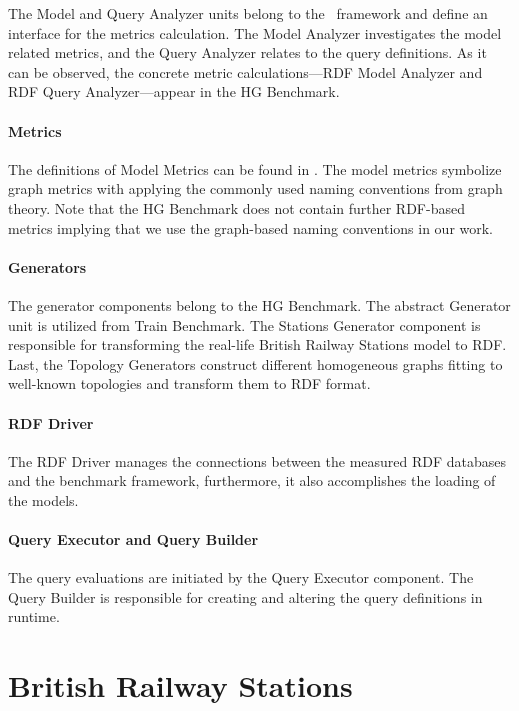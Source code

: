 The \textsf{Model} and \textsf{Query Analyzer} units belong to the \framework~framework and define an interface for the metrics calculation. The \textsf{Model Analyzer} investigates the model related metrics, and the \textsf{Query Analyzer} relates to the query definitions. As it can be observed, the concrete metric calculations---\textsf{RDF Model Analyzer} and \textsf{RDF Query Analyzer}---appear in the HG Benchmark.

\paragraph{Metrics}

The definitions of \textsf{Model Metrics} can be found in \framework. The model metrics symbolize graph metrics with applying the commonly used naming conventions from graph theory. Note that the HG Benchmark does not contain further RDF-based metrics implying that we use the graph-based naming conventions in our work.

\paragraph{Generators}

The generator components belong to the HG Benchmark. The abstract \textsf{Generator} unit is utilized from Train Benchmark. The \textsf{Stations Generator} component is responsible for transforming the real-life British Railway Stations model to RDF. Last, the \textsf{Topology Generators} construct different homogeneous graphs fitting to well-known topologies and transform them to RDF format.

\paragraph{RDF Driver}
The \textsf{RDF Driver} manages the connections between the measured RDF databases and the benchmark framework, furthermore, it also accomplishes the loading of the models. 

\paragraph{Query Executor and Query Builder}

The query evaluations are initiated by the \textsf{Query Executor} component. The \textsf{Query Builder} is responsible for creating and altering the query definitions in runtime.

\section{British Railway Stations}

